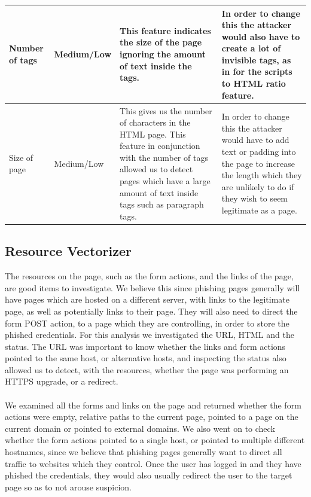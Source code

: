 \documentclass[12pt,twoside]{report}
\begin{document}
\begin{center}
\begin{longtable}{ |>{\raggedright\arraybackslash}p{}|>{\raggedright\arraybackslash}p{}|>{\raggedright\arraybackslash}p{}|>{\raggedright\arraybackslash}p{}| }
\hline
Number of tags & Medium/Low & This feature indicates the size of the page ignoring the amount of text inside the tags. & In order to change this the attacker would also have to create a lot of invisible tags, as in for the scripts to HTML ratio feature.\\
\hline
Size of page & Medium/Low & This gives us the number of characters in the HTML page. This feature in conjunction with the number of tags allowed us to detect pages which have a large amount of text inside tags such as paragraph tags. & In order to change this the attacker would have to add text or padding into the page to increase the length which they are unlikely to do if they wish to seem legitimate as a page.  \\
\hline
\end{longtable}
\end{center}
\restoregeometry
\subsection{Resource Vectorizer}\label{resourcevectorizer}
The resources on the page, such as the form actions, and the links of the page, are good items to investigate. We believe this since phishing pages generally will have pages which are hosted on a different server, with links to the legitimate page, as well as potentially links to their page. They will also need to direct the form POST action, to a page which they are controlling, in order to store the phished credentials. For this analysis we investigated the URL, HTML and the status. The URL was important to know whether the links and form actions pointed to the same host, or alternative hosts, and inspecting the status also allowed us to detect, with the resources, whether the page was performing an HTTPS upgrade, or a redirect.
\\\\
We examined all the forms and links on the page and returned whether the form actions were empty, relative paths to the current page, pointed to a page on the current domain or pointed to external domains. We also went on to check whether the form actions pointed to a single host, or pointed to multiple different hostnames, since we believe that phishing pages generally want to direct all traffic to websites which they control. Once the user has logged in and they have phished the credentials, they would also usually redirect the user to the target page so as to not arouse suspicion.
\end{document}
